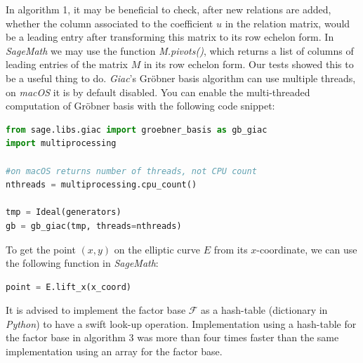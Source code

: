 \documentclass[thesis=M,english]{FITthesis}[2012/10/20]
\theoremstyle{remark}
\theoremstyle{definition}
\begin{document}
\noindent In algorithm 1, it may be beneficial to check, after new relations are added, whether the column associated to the coefficient $u$ in the relation matrix, would be a leading entry after transforming this matrix to its row echelon form. In \textit{SageMath} we may use the function \textit{M.pivots()}, which returns a list of columns of leading entries of the matrix $M$ in its row echelon form. Our tests showed this to be a useful thing to do. \textit{Giac}'s Gröbner basis algorithm can use multiple threads, on \textit{macOS} it is by default disabled. You can enable the multi-threaded computation of Gröbner basis with the following code snippet:
\begin{lstlisting}[language=Python]
from sage.libs.giac import groebner_basis as gb_giac
import multiprocessing

#on macOS returns number of threads, not CPU count
nthreads = multiprocessing.cpu_count() 

tmp = Ideal(generators) 
gb = gb_giac(tmp, threads=nthreads)
\end{lstlisting}
\hphantom{.}
To get the point $(x,y)$ on the elliptic curve $E$ from its $x$-coordinate, we can use the following function in \textit{SageMath}:
\begin{lstlisting}[language=Python]
point = E.lift_x(x_coord)
\end{lstlisting}
\hphantom{.}
It is advised to implement the factor base $\mathcal{F}$ as a hash-table (dictionary in \textit{Python}) to have a swift look-up operation. Implementation using a hash-table for the factor base in algorithm 3 was more than four times faster than the same implementation using an array for the factor base.
\end{document}
